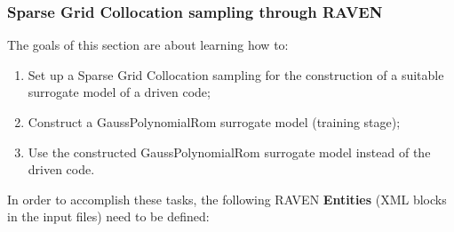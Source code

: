 \subsubsection{Sparse Grid Collocation sampling through RAVEN}
\label{subsub:SGcsamplingExample}
The goals of this section are about learning how to:
 \begin{enumerate}
   \item Set up a Sparse Grid Collocation sampling for the construction of a suitable surrogate model of a driven code;
   \item Construct a GaussPolynomialRom surrogate model (training stage);
   \item Use the constructed GaussPolynomialRom surrogate model instead of the driven code.
\end{enumerate}  
In order to accomplish these tasks, the following RAVEN \textbf{Entities} (XML blocks in the input files) need to be defined:
